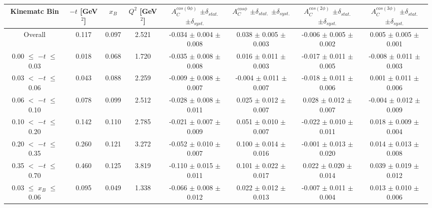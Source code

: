 {\begin{table}[width=15cm]
 \begin{center}
\resizebox{16cm}{!} {
  \begin{tabular}{|c|c|c|c|c|c|c|c|}
\hline
Kinematc Bin &  $-t$ [GeV$^{2}$] & $x_{B}$ & $Q^{2}$ [GeV$^{2}$] & 
$A^{cos (0\phi)}_{C}$ $\pm \delta_{stat.}$ $\pm \delta_{syst.}$ & $A^{cos \phi}_{C}$ $\pm \delta_{stat.}$ $\pm \delta_{syst.}$
& $A^{cos (2\phi)}_{C}$ $\pm \delta_{stat.}$ $\pm \delta_{syst.}$ & $A^{cos (3\phi)}_{C}$ $\pm \delta_{stat.}$ $\pm \delta_{syst.}$ \\
\hline
\hline
Overall &  0.117 & 0.097 &  2.521 &  -0.034 $\pm$  0.004 $\pm$  0.008 & 
0.038  $\pm$  0.005 $\pm$   0.003 &  -0.006  $\pm$  0.005  $\pm$   0.002 &  0.005  $\pm$   0.005   $\pm$   0.001 \\
\hline
0.00 $\leqslant$ $-t$ $\leqslant$ 0.03 &  0.018 & 0.068 &  1.720 &  -0.035  $\pm$  0.008 $\pm$ 0.008 & 
0.016  $\pm$  0.011  $\pm$   0.003 &  -0.017  $\pm$  0.011 $\pm$  0.005 &  -0.008   $\pm$  0.011   $\pm$   0.003\\
0.03 $<$ $-t$ $\leqslant$ 0.06 &  0.043 & 0.088 &  2.259& -0.009  $\pm$  0.008  $\pm$   0.007 &
 -0.004 $\pm$  0.011  $\pm$   0.007 &  -0.018  $\pm$  0.011  $\pm$  0.006 &  0.001   $\pm$  0.011   $\pm$   0.006\\
0.06 $<$ $-t$ $\leqslant$ 0.10 &  0.078 & 0.099 &  2.512 & -0.028  $\pm$  0.008  $\pm$  0.011 & 
0.025 $\pm$  0.012  $\pm$   0.007 & 0.028  $\pm$  0.012 $\pm$   0.007 &  -0.004   $\pm$  0.012  $\pm$    0.009\\
0.10 $<$ $-t$ $\leqslant$ 0.20 &  0.142 & 0.110 &  2.785 &  -0.021  $\pm$  0.007   $\pm$  0.009 & 
0.051 $\pm$  0.010  $\pm$   0.007 &  -0.022  $\pm$  0.010  $\pm$  0.011 & 0.018   $\pm$  0.009    $\pm$  0.004\\
0.20 $<$ $-t$ $\leqslant$ 0.35 &  0.260 & 0.121 &  3.272 &  -0.052 $\pm$   0.010  $\pm$  0.007 &
0.100 $\pm$  0.014  $\pm$ 0.016 & -0.001 $\pm$   0.013  $\pm$  0.020 & 0.014  $\pm$   0.013   $\pm$   0.008\\
0.35 $<$ $-t$ $\leqslant$ 0.70 &  0.460 & 0.125 &  3.819 &  -0.110  $\pm$  0.015  $\pm$   0.011 & 
0.101 $\pm$  0.022  $\pm$   0.017 & 0.022 $\pm$   0.020  $\pm$  0.014 & 0.039   $\pm$  0.019   $\pm$ 0.012\\
\hline
0.03 $\leqslant$ $x_{B}$ $\leqslant$ 0.06 &  0.095 & 0.049 &  1.338 &  -0.066  $\pm$  0.008  $\pm$   0.012 & 
 0.022  $\pm$  0.012  $\pm$   0.013 & -0.007 $\pm$  0.011 $\pm$   0.004 &  0.013   $\pm$  0.010  $\pm$    0.006\\

\end{tabular}}
\end{center}
\end{table}}
